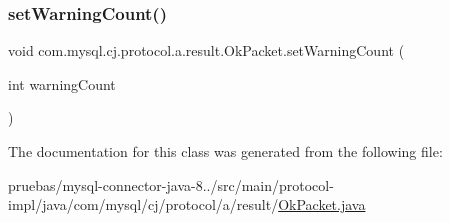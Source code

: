 \subsubsection{\texorpdfstring{set\+Warning\+Count()}{setWarningCount()}}
{\footnotesize\ttfamily void com.\+mysql.\+cj.\+protocol.\+a.\+result.\+Ok\+Packet.\+set\+Warning\+Count (\begin{DoxyParamCaption}\item[{int}]{warning\+Count }\end{DoxyParamCaption})}



The documentation for this class was generated from the following file\+:\begin{DoxyCompactItemize}
\item 
pruebas/mysql-\/connector-\/java-\/8../src/main/protocol-\/impl/java/com/mysql/cj/protocol/a/result/\mbox{\hyperlink{_ok_packet_8java}{Ok\+Packet.\+java}}\end{DoxyCompactItemize}
